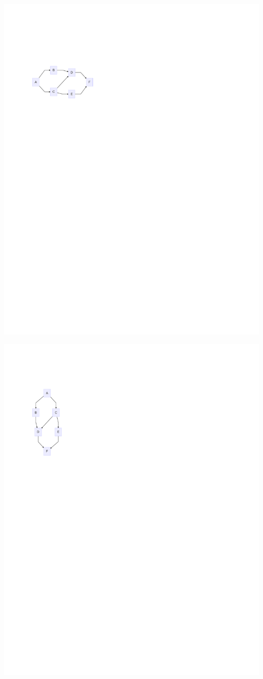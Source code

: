 \documentclass[
  letterpaper,
]{scrbook}
\begin{document}
\includegraphics{./summary_files/figure-pdf/unnamed-chunk-2-1.pdf}

\includegraphics{./summary_files/figure-pdf/unnamed-chunk-3-1.pdf}
\end{document}
